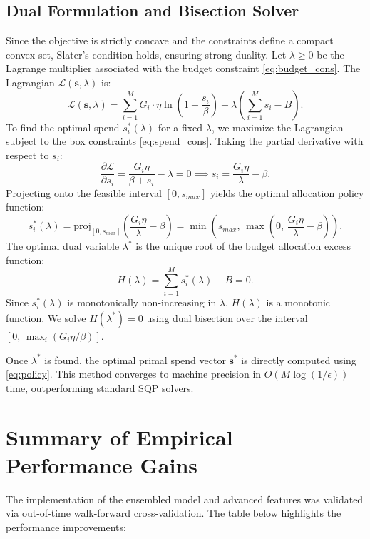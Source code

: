\documentclass[11pt,a4paper]{article}
\theoremstyle{definition}
\begin{document}
\subsection{Dual Formulation and Bisection Solver}
Since the objective is strictly concave and the constraints define a compact convex set, Slater's condition holds, ensuring strong duality. Let $\lambda \ge 0$ be the Lagrange multiplier associated with the budget constraint \eqref{eq:budget_cons}. The Lagrangian $\mathcal{L}(\bm{s}, \lambda)$ is:
\begin{equation}
    \mathcal{L}(\bm{s}, \lambda) = \sum_{i=1}^M G_i \cdot \eta \ln\left(1 + \frac{s_i}{\beta}\right) - \lambda \left(\sum_{i=1}^M s_i - B\right).
\end{equation}
To find the optimal spend $s_i^*(\lambda)$ for a fixed $\lambda$, we maximize the Lagrangian subject to the box constraints \eqref{eq:spend_cons}. Taking the partial derivative with respect to $s_i$:
\begin{equation}
    \frac{\partial \mathcal{L}}{\partial s_i} = \frac{G_i \eta}{\beta + s_i} - \lambda = 0 \implies s_i = \frac{G_i \eta}{\lambda} - \beta.
\end{equation}
Projecting onto the feasible interval $[0, s_{max}]$ yields the optimal allocation policy function:
\begin{equation}\label{eq:policy}
    s_i^*(\lambda) = \text{proj}_{[0, s_{max}]}\left(\frac{G_i \eta}{\lambda} - \beta\right) = \min\left(s_{max}, \, \max\left(0, \, \frac{G_i \eta}{\lambda} - \beta\right)\right).
\end{equation}
The optimal dual variable $\lambda^*$ is the unique root of the budget allocation excess function:
\begin{equation}
    H(\lambda) = \sum_{i=1}^M s_i^*(\lambda) - B = 0.
\end{equation}
Since $s_i^*(\lambda)$ is monotonically non-increasing in $\lambda$, $H(\lambda)$ is a monotonic function. We solve $H(\lambda^*) = 0$ using dual bisection over the interval $[0, \, \max_i(G_i \eta / \beta)]$.

Once $\lambda^*$ is found, the optimal primal spend vector $\bm{s}^*$ is directly computed using \eqref{eq:policy}. This method converges to machine precision in $O(M \log(1/\epsilon))$ time, outperforming standard SQP solvers.

\section{Summary of Empirical Performance Gains}
The implementation of the ensembled model and advanced features was validated via out-of-time walk-forward cross-validation. The table below highlights the performance improvements:
\end{document}

